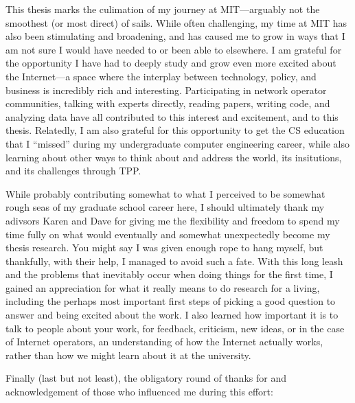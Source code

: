 This thesis marks the culimation of my journey at MIT---arguably not the smoothest (or most direct) of sails. While often challenging, my time at MIT has also been stimulating and broadening, and has caused me to grow in ways that I am not sure I would have needed to or been able to elsewhere. I am grateful for the opportunity I have had to deeply study and grow even more excited about the Internet---a space where the interplay between technology, policy, and business is incredibly rich and interesting. Participating in network operator communities, talking with experts directly, reading papers, writing code, and analyzing data have all contributed to this interest and excitement, and to this thesis. Relatedly, I am also grateful for this opportunity to get the CS education that I ``missed'' during my undergraduate computer engineering career, while also learning about other ways to think about and address the world, its insitutions, and its challenges through TPP.

While probably contributing somewhat to what I perceived to be somewhat rough seas of my graduate school career here, I should ultimately thank my adivsors Karen and Dave for giving me the flexibility and freedom to spend my time fully on what would eventually and somewhat unexpectedly become my thesis research. You might say I was given enough rope to hang myself, but thankfully, with their help, I managed to avoid such a fate. With this long leash and the problems that inevitably occur when doing things for the first time, I gained an appreciation for what it really means to do research for a living, including the perhaps most important first steps of picking a good question to answer and being excited about the work. I also learned how important it is to talk to people about your work, for feedback, criticism, new ideas, or in the case of Internet operators, an understanding of how the Internet actually works, rather than how we might learn about it at the university.


\vspace{1em}

Finally (last but not least), the obligatory round of thanks for and acknowledgement of those who influenced me during this effort:

